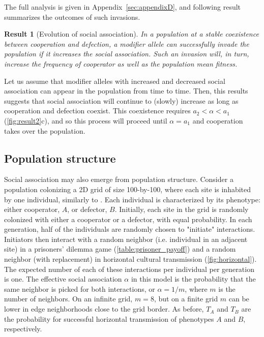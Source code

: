 \documentclass[12pt]{extarticle}
\newtheorem{result}{Result}
\begin{document}
The full analysis is given in Appendix~\ref{sec:appendixD}, and following result summarizes the outcomes of such invasions.
\\

\begin{result}[Evolution of social association] 
\label{result:evol_social_association}
In a population at a stable coexistence between cooperation and defection, a modifier allele can successfully invade the population if it increases the social association.
Such an invasion will, in turn, increase the frequency of cooperator as well as the population mean fitness.
\end{result}

Let us assume that modifier alleles with increased and decreased social association can appear in the population from time to time.
Then, this results suggests that social association will continue to (slowly) increase as long as cooperation and defection coexist.
This coexistence requires $a_2 < \alpha < a_1$ (\autoref{fig:result2}c), and so this process will proceed until $\alpha=a_1$ and cooperation takes over the population.
\\


\subsection*{Population structure}

Social association may also emerge from population structure.
Consider a  population colonizing a 2D grid of size 100-by-100, where each site is inhabited by one individual, similarly to \citet{lewin2020rockpaperscissors}.
Each individual is characterized by its phenotype: either cooperator, $A$, or defector, $B$.
Initially, each site in the grid is randomly colonized with either a cooperator or a defector, with equal probability.
In each generation, half of the individuals are randomly chosen to "initiate" interactions.
Initiators then interact with a random neighbor (i.e. individual in an adjacent site) in a prisoners' dilemma game (\autoref{table:prisoner_payoff}) and a random neighbor (with replacement) in horizontal cultural transmission (\autoref{fig:horizontal}).
The expected number of each of these interactions per individual per generation is one.
The effective social association $\alpha$ in this model is the probability that the same neighbor is picked for both interactions, or $\alpha=1/m$, where $m$ is the number of neighbors.
On an infinite grid, $m=8$, but on a finite grid $m$ can be lower in edge neighborhoods close to the grid border.
As before, $T_A$ and $T_B$ are the probability for successful horizontal transmission of phenotypes $A$ and $B$, respectively.
\end{document}
